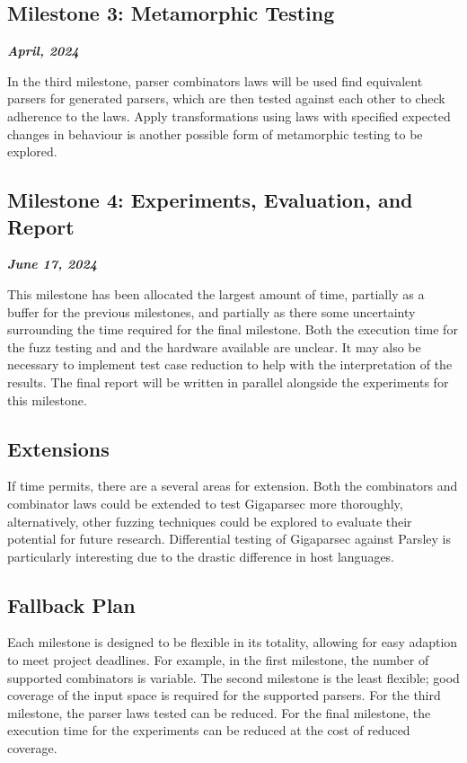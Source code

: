 \documentclass[11pt]{article}
\newcommand{\be}[1]{\textbf{\emph{#1}}}
\begin{document}
\subsection{Milestone 3: Metamorphic Testing}
\be{April, 2024}

In the third milestone, parser combinators laws will be used find equivalent parsers for generated parsers, which are then tested against each other to check adherence to the laws. Apply transformations using laws with specified expected changes in behaviour is another possible form of metamorphic testing to be explored.

\subsection{Milestone 4: Experiments, Evaluation, and Report}
\be{June 17, 2024}

This milestone has been allocated the largest amount of time, partially as a buffer for the previous milestones, and partially as there some uncertainty surrounding the time required for the final milestone. Both the execution time for the fuzz testing and and the hardware available are unclear. It may also be necessary to implement test case reduction to help with the interpretation of the results. The final report will be written in parallel alongside the experiments for this milestone.

\subsection{Extensions}

If time permits, there are a several areas for extension. Both the combinators and combinator laws could be extended to test Gigaparsec more thoroughly, alternatively, other fuzzing techniques could be explored to evaluate their potential for future research. Differential testing of Gigaparsec against Parsley is particularly interesting due to the drastic difference in host languages.

\subsection{Fallback Plan}
Each milestone is designed to be flexible in its totality, allowing for easy adaption to meet project deadlines. For example, in the first milestone, the number of supported combinators is variable. The second milestone is the least flexible; good coverage of the input space is required for the supported parsers. For the third milestone, the parser laws tested can be reduced. For the final milestone, the execution time for the experiments can be reduced at the cost of reduced coverage.

\raggedright

\end{document}
